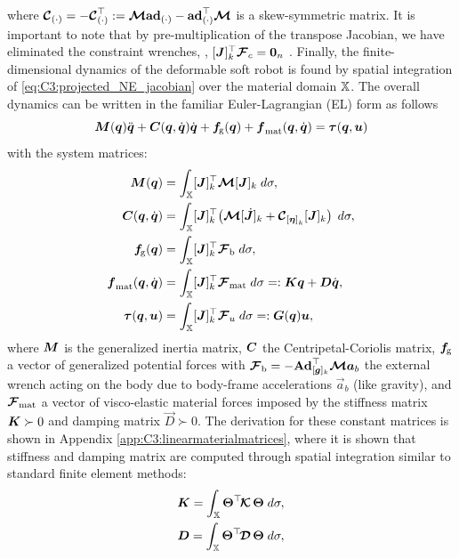%
where ${\boldsymbol{\mathcal{C}}}_{(\cdot)} = -{\boldsymbol{\mathcal{C}}}_{(\cdot)} ^\top :=  {\boldsymbol{\mathcal{M}}} \textbf{ad}_{(\cdot)}  - \textbf{ad}_{(\cdot)} ^\top {\boldsymbol{\mathcal{M}}}$ is a skew-symmetric matrix. It is important to note that by pre-multiplication of the transpose Jacobian, we have eliminated the constraint wrenches, \ie, $[{\boldsymbol{J}}]_k^\top {\boldsymbol{\mathcal{F}}}_c = \boldsymbol{0}_n$ \cite{Murray1994}. Finally, the finite-dimensional dynamics of the deformable soft robot is found by spatial integration of \eqref{eq:C3:projected_NE_jacobian} over the material domain $\mathbb{X}$. The overall dynamics can be written in the familiar Euler-Lagrangian (EL) form as follows
%
\begin{equation}
  \boldsymbol{M}(\boldsymbol{q})\ddot{\boldsymbol{q}} + \boldsymbol{C}(\boldsymbol{q},\dot{\boldsymbol{q}})\dot{\boldsymbol{q}} + \boldsymbol{f}\!_{\scriptstyle\textrm{g}}(\boldsymbol{q}) + \boldsymbol{f}_{\textrm{mat}}(\boldsymbol{q},\dot{\boldsymbol{q}}) = \boldsymbol{\tau}(\boldsymbol{q},{\boldsymbol{u}})
  \label{eq:C3:dyn_model_lag}
\end{equation}
%
with the system matrices:
%
\begin{align}
 {\boldsymbol{M}}({\boldsymbol{q}}) & = \int_{\mathbb{X}} [\boldsymbol{J}]_k^\top \boldsymbol{\mathcal{M}} [\boldsymbol{J}]_k \; d \sigma, \label{eq:C3:lag_M} \\
 \boldsymbol{C}({\boldsymbol{q}},{\dot{\boldsymbol{q}}}) & = \int_{\mathbb{X}} [{\boldsymbol{J}}]_k^\top \!\left(\boldsymbol{\mathcal{M}} [\,\,\dot{\!\!\boldsymbol{J}}]_k + \boldsymbol{\mathcal{C}}_{{[\boldsymbol{\eta}]}_k}[\boldsymbol{J}]_k \right) \; d \sigma, \label{eq:C3:lag_C} \\
\boldsymbol{f}\!_{\scriptstyle\textrm{g}}({\boldsymbol{q}}) & = \int_{\mathbb{X}} [{\boldsymbol{J}}]_k^\top \boldsymbol{\mathcal{F}}_\textrm{b} \; d \sigma, \\
\boldsymbol{f}_{\textrm{mat}}({\boldsymbol{q}},{\dot{\boldsymbol{q}}}) & = \int_{\mathbb{X}} [{\boldsymbol{J}}]_k^\top  \boldsymbol{\mathcal{F}}_{\textrm{mat}} \; d \sigma =: \boldsymbol{K}\boldsymbol{q} + \boldsymbol{D}\dot{\boldsymbol{q}},
\label{eq:C3:lag_G} \\
\boldsymbol{\tau}({\boldsymbol{q}},{\boldsymbol{u}}) & = \int_{\mathbb{X}} [\boldsymbol{J}]_k^\top \boldsymbol{\mathcal{F}}_u \; d\sigma =: \boldsymbol{G}({\boldsymbol{q}}) \boldsymbol{u}, \label{eq:C3:lag_tau}
\end{align}
%
\noindent where $\boldsymbol{M}$ is the generalized inertia matrix, $\boldsymbol{C}$ the  Centripetal-Coriolis matrix, ${\boldsymbol{f}}\!_{\scriptstyle\textrm{g}}$ a vector of generalized potential forces with $\boldsymbol{\mathcal{F}}_\textrm{b} = -\textbf{Ad}_{[{\boldsymbol{g}}]_k}^\top \boldsymbol{\mathcal{M}} \boldsymbol{a}_b$ the external wrench acting on the body due to body-frame accelerations $\vec{a}_b$ (like gravity), and $\boldsymbol{\mathcal{F}}_\textrm{mat}$ a vector of visco-elastic material forces imposed by the stiffness matrix $\boldsymbol{K} \succ 0$ and damping matrix $\vec{D} \succ 0$. The derivation for these constant matrices is shown in Appendix \ref{app:C3:linearmaterialmatrices}, where it is shown that stiffness and damping matrix are computed through spatial integration similar to standard finite element methods:
%
\begin{align}
\boldsymbol{K} = \int_{\mathbb{X}} \boldsymbol{\Theta}^\top \!\boldsymbol{\mathcal{K}}\, \boldsymbol{\Theta} \; d\sigma, \label{eq:C3:stiff_mat}\\
\boldsymbol{D} = \int_{\mathbb{X}} \boldsymbol{\Theta}^\top \!\boldsymbol{\mathcal{D}}\, \boldsymbol{\Theta} \; d\sigma, \label{eq:C3:damp_mat}
\end{align}
